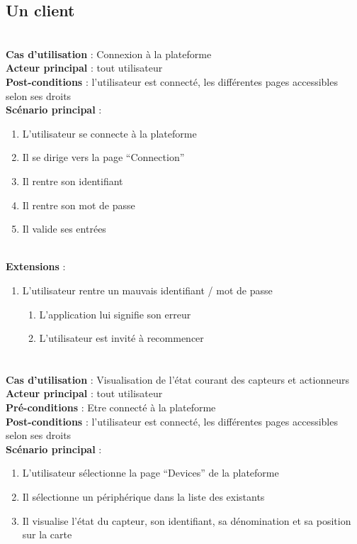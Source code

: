 \subsection{Un client}
~\\
\textbf{Cas d’utilisation} : Connexion à la plateforme\\
\textbf{Acteur principal} :   tout utilisateur\\
\textbf{Post-conditions} :   l’utilisateur est connecté, les différentes pages accessibles selon ses droits\\
\textbf{Scénario principal} :
\begin{enumerate}
 \item L’utilisateur se connecte à la plateforme
 \item Il se dirige vers la page “Connection”
 \item Il rentre son identifiant
 \item Il rentre son mot de passe
 \item Il valide ses entrées
\end{enumerate}
~\\
\textbf{Extensions} :
\begin{enumerate}
 \item L’utilisateur rentre un mauvais identifiant / mot de passe
    \begin{enumerate}
     \item L’application lui signifie son erreur
     \item L’utilisateur est invité à recommencer
    \end{enumerate}
\end{enumerate}

\paragraph{}
~\\
\textbf{Cas d’utilisation} : Visualisation de l’état courant des capteurs et actionneurs\\
\textbf{Acteur principal} :   tout utilisateur\\
\textbf{Pré-conditions} : Etre connecté à la plateforme\\
\textbf{Post-conditions} :   l’utilisateur est connecté, les différentes pages accessibles selon ses droits\\
\textbf{Scénario principal} :
\begin{enumerate}
 \item L’utilisateur sélectionne la page “Devices” de la plateforme
 \item Il sélectionne un périphérique dans la liste des existants
 \item Il visualise l’état du capteur, son identifiant, sa dénomination et sa position sur la carte
\end{enumerate}


